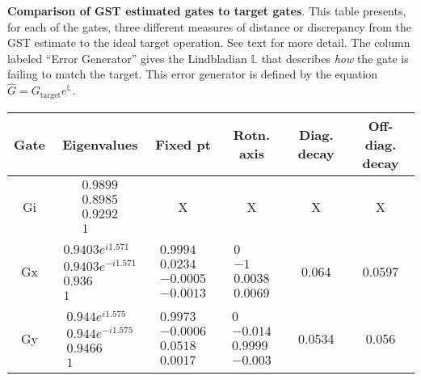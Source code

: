 {\begin{table}[h]
\begin{center}
\caption{\textbf{Comparison of GST estimated gates to target gates}.  This table presents, for each of the gates, three different measures of distance or discrepancy from the GST estimate to the ideal target operation.  See text for more detail.  The column labeled ``Error Generator'' gives the Lindbladian $\mathbb{L}$ that describes \emph{how} the gate is failing to match the target.  This error generator is defined by the equation $\hat{G} = G_{\mathrm{target}}e^{\mathbb{L}}$. \label{bestTargetGatesGatesetVsTargetTable}}
\end{center}
\end{table}

\begin{table}[h]
\begin{center}
\begin{tabular}[l]{|c|c|c|c|c|c|}
\hline
Gate & Eigenvalues & Fixed pt & Rotn. axis & Diag. decay & Off-diag. decay \\ \hline
Gi & $ \begin{array}{c}
0.9899 \\ 
0.8985 \\ 
0.9292 \\ 
1
 \end{array} $
 & X & X & X & X \\ \hline
Gx & $ \begin{array}{c}
0.9403e^{i1.571} \\ 
0.9403e^{-i1.571} \\ 
0.936 \\ 
1
 \end{array} $
 & $ \begin{array}{c}
0.9994 \\ 
0.0234 \\ 
-0.0005 \\ 
-0.0013
 \end{array} $
 & $ \begin{array}{c}
0 \\ 
-1 \\ 
0.0038 \\ 
0.0069
 \end{array} $
 & 0.064 & 0.0597 \\ \hline
Gy & $ \begin{array}{c}
0.944e^{i1.575} \\ 
0.944e^{-i1.575} \\ 
0.9466 \\ 
1
 \end{array} $
 & $ \begin{array}{c}
0.9973 \\ 
-0.0006 \\ 
0.0518 \\ 
0.0017
 \end{array} $
 & $ \begin{array}{c}
0 \\ 
-0.014 \\ 
0.9999 \\ 
-0.003
 \end{array} $
 & 0.0534 & 0.056 \\ \hline
\end{tabular}


\end{center}
\end{table}}
